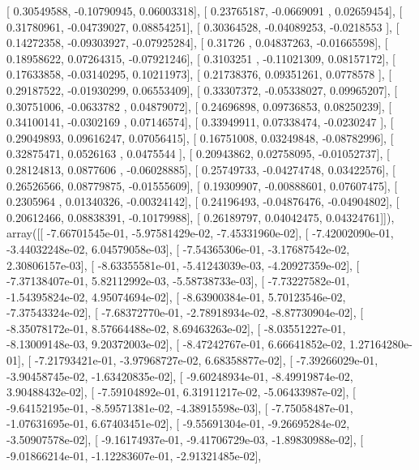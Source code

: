 \documentclass{article}
\begin{document}
       [ 0.30549588, -0.10790945,  0.06003318],
       [ 0.23765187, -0.0669091 ,  0.02659454],
       [ 0.31780961, -0.04739027,  0.08854251],
       [ 0.30364528, -0.04089253, -0.0218553 ],
       [ 0.14272358, -0.09303927, -0.07925284],
       [ 0.31726   ,  0.04837263, -0.01665598],
       [ 0.18958622,  0.07264315, -0.07921246],
       [ 0.3103251 , -0.11021309,  0.08157172],
       [ 0.17633858, -0.03140295,  0.10211973],
       [ 0.21738376,  0.09351261,  0.0778578 ],
       [ 0.29187522, -0.01930299,  0.06553409],
       [ 0.33307372, -0.05338027,  0.09965207],
       [ 0.30751006, -0.0633782 ,  0.04879072],
       [ 0.24696898,  0.09736853,  0.08250239],
       [ 0.34100141, -0.0302169 ,  0.07146574],
       [ 0.33949911,  0.07338474, -0.0230247 ],
       [ 0.29049893,  0.09616247,  0.07056415],
       [ 0.16751008,  0.03249848, -0.08782996],
       [ 0.32875471,  0.0526163 ,  0.0475544 ],
       [ 0.20943862,  0.02758095, -0.01052737],
       [ 0.28124813,  0.0877606 , -0.06028885],
       [ 0.25749733, -0.04274748,  0.03422576],
       [ 0.26526566,  0.08779875, -0.01555609],
       [ 0.19309907, -0.00888601,  0.07607475],
       [ 0.2305964 ,  0.01340326, -0.00324142],
       [ 0.24196493, -0.04876476, -0.04904802],
       [ 0.20612466,  0.08838391, -0.10179988],
       [ 0.26189797,  0.04042475,  0.04324761]]), array([[ -7.66701545e-01,  -5.97581429e-02,  -7.45331960e-02],
       [ -7.42002090e-01,  -3.44032248e-02,   6.04579058e-03],
       [ -7.54365306e-01,  -3.17687542e-02,   2.30806157e-03],
       [ -8.63355581e-01,  -5.41243039e-03,  -4.20927359e-02],
       [ -7.37138407e-01,   5.82112992e-03,  -5.58738733e-03],
       [ -7.73227582e-01,  -1.54395824e-02,   4.95074694e-02],
       [ -8.63900384e-01,   5.70123546e-02,  -7.37543324e-02],
       [ -7.68372770e-01,  -2.78918934e-02,  -8.87730904e-02],
       [ -8.35078172e-01,   8.57664488e-02,   8.69463263e-02],
       [ -8.03551227e-01,  -8.13009148e-03,   9.20372003e-02],
       [ -8.47242767e-01,   6.66641852e-02,   1.27164280e-01],
       [ -7.21793421e-01,  -3.97968727e-02,   6.68358877e-02],
       [ -7.39266029e-01,  -3.90458745e-02,  -1.63420835e-02],
       [ -9.60248934e-01,  -8.49919874e-02,   3.90488432e-02],
       [ -7.59104892e-01,   6.31911217e-02,  -5.06433987e-02],
       [ -9.64152195e-01,  -8.59571381e-02,  -4.38915598e-03],
       [ -7.75058487e-01,  -1.07631695e-01,   6.67403451e-02],
       [ -9.55691304e-01,  -9.26695284e-02,  -3.50907578e-02],
       [ -9.16174937e-01,  -9.41706729e-03,  -1.89830988e-02],
       [ -9.01866214e-01,  -1.12283607e-01,  -2.91321485e-02],
\end{document}
